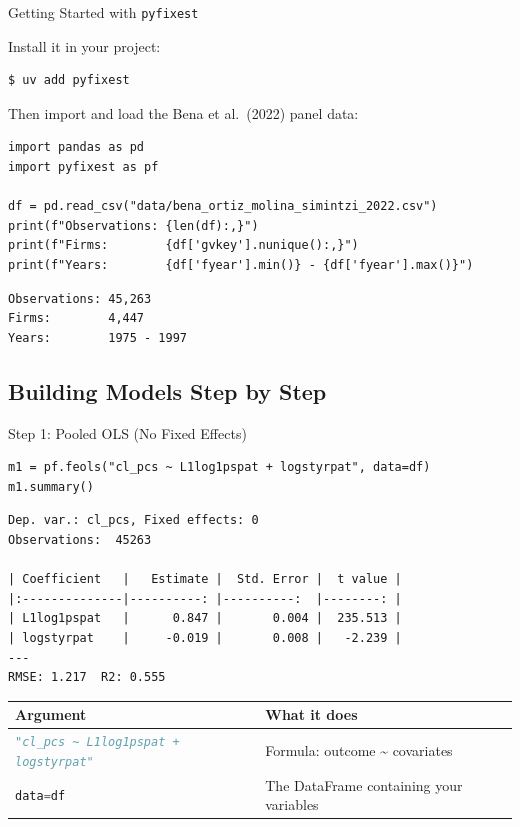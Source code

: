 \documentclass[9pt,aspectratio=169]{beamer}
\newcommand{\py}[1]{\lstinline[language=Python]{#1}}
\begin{document}
\begin{frame}[fragile]{Getting Started with \texttt{pyfixest}}

Install it in your project:

\begin{lstlisting}[style=shell]
$ uv add pyfixest
\end{lstlisting}

\medskip

Then import and load the Bena et al.\ (2022) panel data:

\begin{lstlisting}
import pandas as pd
import pyfixest as pf

df = pd.read_csv("data/bena_ortiz_molina_simintzi_2022.csv")
print(f"Observations: {len(df):,}")
print(f"Firms:        {df['gvkey'].nunique():,}")
print(f"Years:        {df['fyear'].min()} - {df['fyear'].max()}")
\end{lstlisting}

\medskip

\begin{lstlisting}[style=output]
Observations: 45,263
Firms:        4,447
Years:        1975 - 1997
\end{lstlisting}

\end{frame}


\subsection{Building Models Step by Step}
\begin{frame}[fragile]{Step 1: Pooled OLS (No Fixed Effects)}

\begin{lstlisting}
m1 = pf.feols("cl_pcs ~ L1log1pspat + logstyrpat", data=df)
m1.summary()
\end{lstlisting}

\begin{lstlisting}[style=output]
Dep. var.: cl_pcs, Fixed effects: 0
Observations:  45263

| Coefficient   |   Estimate |  Std. Error |  t value |
|:--------------|----------: |----------:  |--------: |
| L1log1pspat   |      0.847 |       0.004 |  235.513 |
| logstyrpat    |     -0.019 |       0.008 |   -2.239 |
---
RMSE: 1.217  R2: 0.555
\end{lstlisting}

\medskip

\begin{tabular}{@{}lp{7cm}@{}}
\toprule
\textbf{Argument} & \textbf{What it does} \\
\midrule
\py{"cl_pcs ~ L1log1pspat + logstyrpat"} & Formula: outcome \textasciitilde{} covariates \\[0.3em]
\py{data=df} & The DataFrame containing your variables \\
\bottomrule
\end{tabular}

\end{frame}
\end{document}
